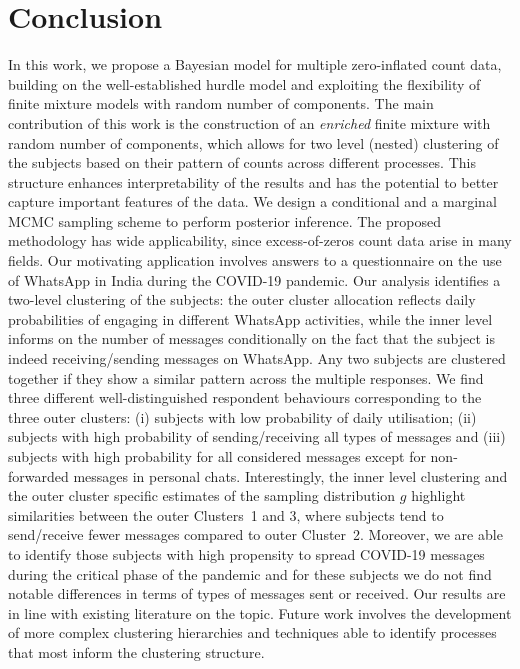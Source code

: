 \documentclass[11pt]{article}
\begin{document}
\section{Conclusion}\label{sec:Concludes}
In this work, we propose a Bayesian  model for multiple zero-inflated count data, building on the well-established hurdle model and exploiting the flexibility of finite mixture models with random number of components. The main contribution of this work is the construction of an {\em enriched} finite mixture with random number of components, which allows for two level (nested) clustering of the subjects based on their pattern of counts across different processes. This structure enhances interpretability of the results and has the potential to better capture important features of the data. We design a conditional and a marginal MCMC sampling scheme to perform posterior inference. The proposed methodology has wide applicability, since excess-of-zeros count data arise in many fields. 
Our motivating application involves answers to a questionnaire on the use of WhatsApp in India during the COVID-19 pandemic. Our analysis identifies a two-level clustering of the subjects: the outer cluster allocation reflects daily probabilities of engaging in different WhatsApp activities, while the inner level informs on the number of messages conditionally on the fact that the subject is indeed receiving/sending messages on WhatsApp. 
Any two subjects are clustered together if they show a similar pattern across the multiple responses. 
We find three different well-distinguished respondent behaviours corresponding to the three outer clusters: (i) subjects with low probability of daily utilisation; (ii) subjects with high probability of sending/receiving all types of messages and (iii) subjects with high probability for all considered messages except for non-forwarded messages in personal chats. Interestingly, the inner level clustering and the outer cluster specific estimates of the sampling distribution $g$ highlight similarities between the outer Clusters~1 and 3, where subjects tend to send/receive fewer messages compared to outer Cluster~2. Moreover, we are able to identify those subjects with high propensity to
spread COVID-19 messages during the critical phase of the pandemic and for these subjects we do not find notable differences in terms of types of messages sent or received.
Our results are in line with existing literature on the topic. Future work involves the development of more complex clustering hierarchies and techniques able to identify processes that most inform the clustering structure. 
\end{document}
